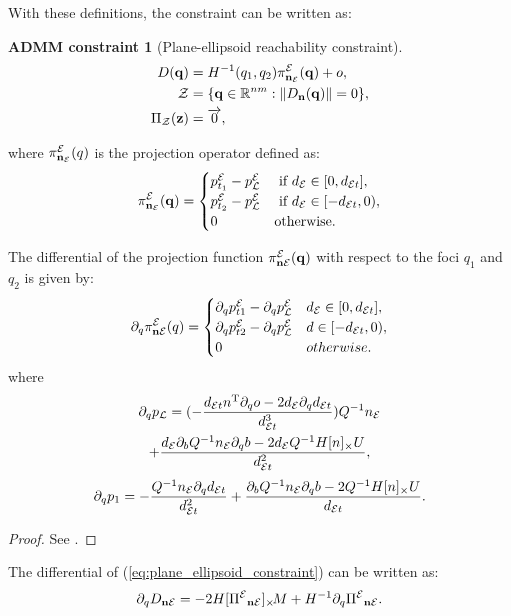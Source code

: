 \documentclass[10pt,twocolumn,twoside]{IEEEtran}
\newtheorem{constraint}{ADMM constraint}
\def\sZ{\mathcal{Z}}
\begin{document}
With these definitions, the constraint can be written as:
\begin{constraint}[Plane-ellipsoid reachability constraint]
\begin{align}
D(\vq) &= H^{-1}(q_{1},q_2)\pi^\cE_{\vn_\cE}(\vq)+o, \label{eq:plane_ellipsoid_constraint}\\
  \sZ &= \{\vq\in\mathbb{R}^{nm}:\norm{D_{\vn}(\vq)} = 0 \},\\
   \Pi_\sZ(\vz) & = \overrightarrow{0}, 
\end{align}
\end{constraint}
where $\pi^{\mathcal{E}}_{\mathbf{n}_{\mathcal{E}}}(q)$ is the projection operator defined as:
  \begin{equation}\label{equ:plane2ellipse}
    \pi^{\mathcal{E}}_{\mathbf{n}_{\mathcal{E}}}(\mathbf{q}) =\begin{cases}
      p^{\mathcal{E}}_{t_1}-p^{\mathcal{E}}_{\mathcal{L}} & \textrm{ if } d_{\mathcal{E}} \in [0, d_{\mathcal{E} t}], \\
      p^{\mathcal{E}}_{t_2}-p^{\mathcal{E}}_{\mathcal{L}} &  \textrm{ if } d_{\mathcal{E}} \in [- d_{\mathcal{E} t},0), \\
      {0} & \textrm{otherwise}.
    \end{cases}
  \end{equation}

  \begin{proposition}\label{prop:dpi_ne_dt}
    The differential of the projection function $\pi^{\mathcal{E}}_{\mathbf{n} \mathcal{E}}(\mathbf{q})$ with respect to the foci $q_1$ and $q_2$ is given by:
    \begin{equation}
      \partial_q \pi^{\mathcal{E}}_{\mathbf{n} \mathcal{E}}(q) = \begin{cases}
        \partial_q p^{\mathcal{E}}_{t1}-\partial_q p^{\mathcal{E}}_{\mathcal{L}} &  d_{\mathcal{E}} \in [0, d_{\mathcal{E} t}], \\
        \partial_q p^{\mathcal{E}}_{t2}-\partial_q p^{\mathcal{E}}_{\mathcal{L}} &  d \in [- d_{\mathcal{E} t},0), \\
        {0} & otherwise.
      \end{cases}
    \end{equation}
    where
    \begin{multline}
      \partial_q p_{\mathcal{L}} =   (-\frac{d_{\mathcal{E} t} n^\mathrm{T} \partial_q o -2d_{\mathcal{E}} \partial_q d_{\mathcal{E} t}}{d_{\mathcal{E} t}^3} )Q^{-1}n_{\mathcal{E}} \\
      + \frac{d_{\mathcal{E}}\partial_b Q^{-1} n_{\mathcal{E}} \partial_q b -  2d_{\mathcal{E}} Q^{-1}H[n]_\times U}{d_{\mathcal{E} t}^2},
    \end{multline}
    \begin{equation}
      \partial_q p_{1} =  -\frac{Q^{-1}n_{\mathcal{E}} \partial_q d_{\mathcal{E} t} }{d_{\mathcal{E} t}^2} 
      + \frac{\partial_b Q^{-1}n_{\mathcal{E}} \partial_q b -  2Q^{-1}H[n]_\times U }{d_{\mathcal{E} t}}.
    \end{equation}
  \end{proposition}
  \begin{proof}
  See .
  \end{proof}
 The differential of (\ref{eq:plane_ellipsoid_constraint}) can be written as:
  \begin{equation}
    \partial_q {D_{\mathbf{n}\mathcal{E}}} = -2 H [{\Pi^{\mathcal{E}}}_{\mathbf{n} \mathcal{E}}]_{\times}\!  M + H^{-1}\partial_q {\Pi^{\mathcal{E}}}_{\mathbf{n} \mathcal{E}}.
  \end{equation}
\end{document}

